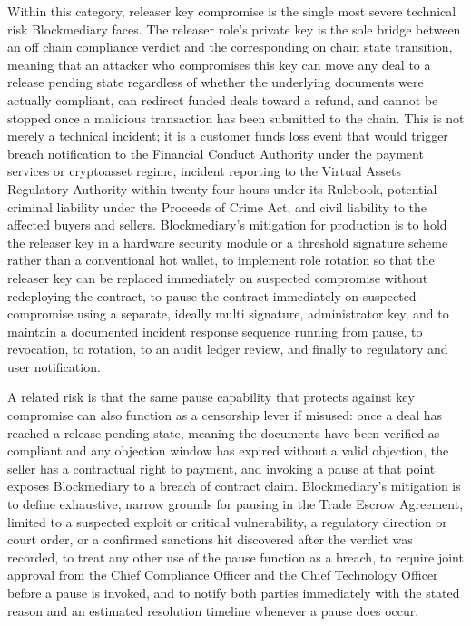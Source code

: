 \documentclass[12pt, a4paper]{article}
\begin{document}
Within this category, releaser key compromise is the single most severe technical risk
Blockmediary faces. The releaser role's private key is the sole bridge between an off
chain compliance verdict and the corresponding on chain state transition, meaning that an
attacker who compromises this key can move any deal to a release pending state regardless
of whether the underlying documents were actually compliant, can redirect funded deals
toward a refund, and cannot be stopped once a malicious transaction has been submitted to
the chain. This is not merely a technical incident; it is a customer funds loss event that
would trigger breach notification to the Financial Conduct Authority under the payment
services or cryptoasset regime, incident reporting to the Virtual Assets Regulatory
Authority within twenty four hours under its Rulebook, potential criminal liability under
the Proceeds of Crime Act, and civil liability to the affected buyers and sellers.
Blockmediary's mitigation for production is to hold the releaser key in a hardware
security module or a threshold signature scheme rather than a conventional hot wallet, to
implement role rotation so that the releaser key can be replaced immediately on suspected
compromise without redeploying the contract, to pause the contract immediately on
suspected compromise using a separate, ideally multi signature, administrator key, and to
maintain a documented incident response sequence running from pause, to revocation, to
rotation, to an audit ledger review, and finally to regulatory and user notification.

A related risk is that the same pause capability that protects against key compromise can
also function as a censorship lever if misused: once a deal has reached a release pending
state, meaning the documents have been verified as compliant and any objection window has
expired without a valid objection, the seller has a contractual right to payment, and
invoking a pause at that point exposes Blockmediary to a breach of contract claim.
Blockmediary's mitigation is to define exhaustive, narrow grounds for pausing in the Trade
Escrow Agreement, limited to a suspected exploit or critical vulnerability, a regulatory
direction or court order, or a confirmed sanctions hit discovered after the verdict was
recorded, to treat any other use of the pause function as a breach, to require joint
approval from the Chief Compliance Officer and the Chief Technology Officer before a pause
is invoked, and to notify both parties immediately with the stated reason and an estimated
resolution timeline whenever a pause does occur.
\end{document}
